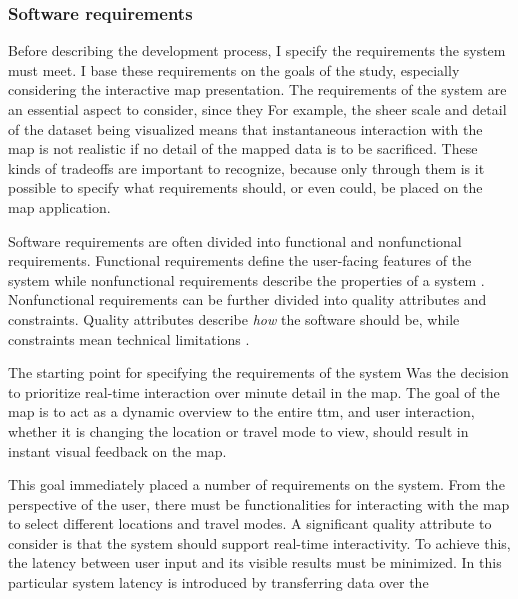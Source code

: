 \subsubsection{Software requirements}

Before describing the development process,
I specify the requirements the system must meet.
I base these requirements on the goals of the study,
especially considering the interactive map presentation.
The requirements of the system are an essential aspect to consider,
since they  %
For example, the sheer scale and detail of the dataset being visualized
means that instantaneous interaction with the map is not realistic
if no detail of the mapped data is to be sacrificed.
These kinds of tradeoffs are important to recognize,
because only through them is it possible to specify what
requirements should, or even could, be placed on the map application.

Software requirements are often divided into
functional and nonfunctional requirements.
Functional requirements define the user-facing features of the system
while nonfunctional requirements describe the properties of a system
\parencite{chu2009}.
Nonfunctional requirements can be further divided into
quality attributes and constraints.
Quality attributes describe \textit{how} the software should be,
while constraints mean technical limitations \parencite{chu2009}.

The starting point for specifying the requirements of the system
Was the decision to prioritize real-time interaction over minute detail in the map.
The goal of the map is to act as a dynamic overview to the entire \acrshort{ttm},
and user interaction, whether it is changing the location or travel mode to view,
should result in instant visual feedback on the map.

This goal immediately placed a number of requirements on the system.
From the perspective of the user,
there must be functionalities for interacting with the map to
select different locations and travel modes.
A significant quality attribute to consider is that the system should
support real-time interactivity.
To achieve this, the latency between user input and
its visible results must be minimized.
In this particular system latency is introduced by transferring data over the

